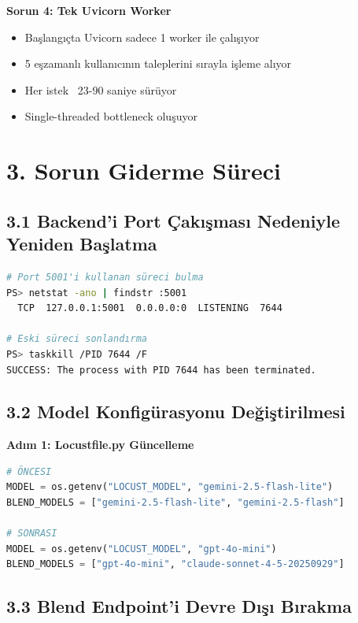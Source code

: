 \documentclass[12pt,a4paper]{report}
\begin{document}
\textbf{Sorun 4: Tek Uvicorn Worker}
\begin{itemize}
    \item Başlangıçta Uvicorn sadece 1 worker ile çalışıyor
    \item 5 eşzamanlı kullanıcının taleplerini sırayla işleme alıyor
    \item Her istek ~23-90 saniye sürüyor
    \item Single-threaded bottleneck oluşuyor
\end{itemize}

\newpage

\section{3. Sorun Giderme Süreci}

\subsection{3.1 Backend'i Port Çakışması Nedeniyle Yeniden Başlatma}

\begin{lstlisting}[language=bash]
# Port 5001'i kullanan süreci bulma
PS> netstat -ano | findstr :5001
  TCP  127.0.0.1:5001  0.0.0.0:0  LISTENING  7644

# Eski süreci sonlandırma
PS> taskkill /PID 7644 /F
SUCCESS: The process with PID 7644 has been terminated.
\end{lstlisting}

\subsection{3.2 Model Konfigürasyonu Değiştirilmesi}

\textbf{Adım 1: Locustfile.py Güncelleme}

\begin{lstlisting}[language=Python]
# ÖNCESI
MODEL = os.getenv("LOCUST_MODEL", "gemini-2.5-flash-lite")
BLEND_MODELS = ["gemini-2.5-flash-lite", "gemini-2.5-flash"]

# SONRASI
MODEL = os.getenv("LOCUST_MODEL", "gpt-4o-mini")
BLEND_MODELS = ["gpt-4o-mini", "claude-sonnet-4-5-20250929"]
\end{lstlisting}

\subsection{3.3 Blend Endpoint'i Devre Dışı Bırakma}
\end{document}
